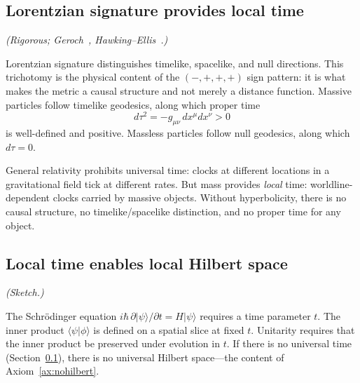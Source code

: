 \documentclass[12pt,a4paper]{article}
\theoremstyle{definition}
\theoremstyle{remark}
\begin{document}
\subsection{Lorentzian signature provides local time}
\label{sec:signature_time}

\emph{(Rigorous; Geroch~\cite{geroch}, Hawking--Ellis~\cite{hawking_ellis}.)}

\medskip

\noindent Lorentzian signature distinguishes timelike, spacelike, and null
directions. This trichotomy is the physical content of the $(-,+,+,+)$
sign pattern: it is what makes the metric a causal structure and not merely
a distance function. Massive particles follow timelike geodesics, along
which proper time
\begin{equation}
d\tau^2 = -g_{\mu\nu}\,dx^\mu dx^\nu > 0
\label{eq:propertime}
\end{equation}
is well-defined and positive. Massless particles follow null geodesics,
along which $d\tau = 0$.

General relativity prohibits universal time: clocks at different locations
in a gravitational field tick at different rates. But mass provides
\emph{local} time: worldline-dependent clocks carried by massive objects.
Without hyperbolicity, there is no causal structure, no
timelike/spacelike distinction, and no proper time for any object.

\subsection{Local time enables local Hilbert space}
\label{sec:time_hilbert}

\emph{(Sketch.)}

\medskip

\noindent The Schr\"odinger equation $i\hbar\,\partial|\psi\rangle/\partial t
= H|\psi\rangle$ requires a time parameter $t$. The inner product
$\langle\psi|\phi\rangle$ is defined on a spatial slice at fixed $t$.
Unitarity requires that the inner product be preserved under evolution in
$t$. If there is no universal time (Section~\ref{sec:signature_time}),
there is no universal Hilbert space---the content of
Axiom~\ref{ax:nohilbert}.
\end{document}
